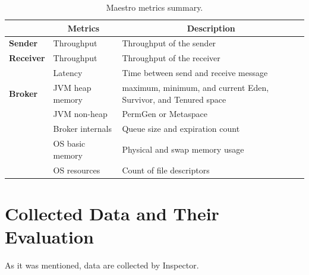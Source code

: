 \begin{table}[H]
\centering
\begin{tabular}{|p{2.5cm}|p{3.5cm}|p{7cm}|}
\hline
\rowcolor[HTML]{C5E3DF} 
\multicolumn{1}{|c|}{\textbf{Component}} & \multicolumn{1}{c|}{\textbf{Metrics}} & \multicolumn{1}{c|}{\textbf{Description}}                       \\ \hline
\textbf{Sender}                          & Throughput                            & Throughput of the sender                                        \\ \hline
\textbf{Receiver}                        & Throughput                            & Throughput of the receiver                                      \\ \hline
\textbf{}                                & Latency                               & Time between send and receive message                           \\ \hline
\textbf{Broker}			                & JVM heap memory                       & maximum, minimum, and current Eden, Survivor, and Tenured space \\ \hline
                                         & JVM non-heap                          & PermGen or Metaspace                                            \\ \hline
                                         & Broker internals                      & Queue size and expiration count                                 \\ \hline
                                         & OS basic memory                       & Physical and swap memory usage                                  \\ \hline
                                         & OS resources                          & Count of file descriptors                                       \\ \hline
\end{tabular}
\caption{Maestro metrics summary.}
\label{tab:maestro_metrics}
\end{table}


\section{Collected Data and Their Evaluation}
\label{Collected Data and Their Evaluation}
As it was mentioned, data are collected by Inspector. 




